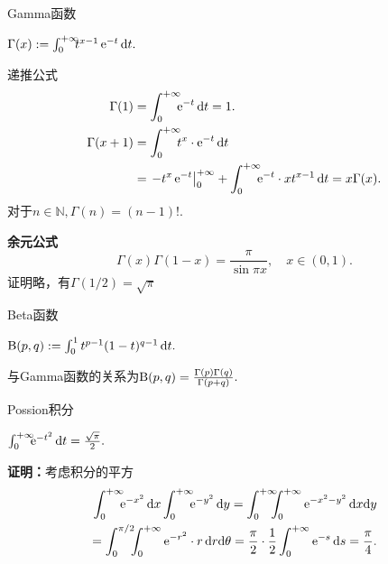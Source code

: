 \begin{example}{Gamma函数}{}
	\begin{center}
		$\Gamma(x):=\int\zti\bs5t^{x-1}\e{-t}\d t.$
	\end{center}
	递推公式
	\begin{align*}
		\Gamma(1)   & =\int\zti\bs5\e{-t}\d t=1.                                              \\
		\Gamma(x+1) & =\int\zti\bs5 t^x\cdot\e{-t}\d t                                        \\
					& =\edg{-t^x\e{-t}}\zti+\int\zti\bs5\e{-t}\cdot xt^{x-1}\d t=x\Gamma(x).
	\end{align*}
	对于$n\in\mathbb N,\Gamma(n)=(n-1)!.$

	\textbf{余元公式}
	\[
		\Gamma(x)\Gamma(1-x)=\frac{\pi}{\sin\pi x},\quad x\in(0,1).
	\]
	证明略，有$\Gamma(1/2)=\sqrt\pi$
\end{example}
\begin{example}{Beta函数}{}
	\begin{center}
		$\text B(p,q):=\int_0^1t^{p-1}(1-t)^{q-1}\d t.$ %
	\end{center}
	与Gamma函数的关系为$\text B(p,q)=\frac{\Gamma(p)\Gamma(q)}{\Gamma(p+q)}.$
\end{example}
\begin{example}{Possion积分}{}
	\begin{center}
		$\int\zti\bs5\e{-t^2}\d t=\frac{\sqrt\pi}2.$
	\end{center}
	\textbf{证明：}考虑积分的平方
	\begin{align*}
		\int\zti\bs5\e{-x^2}\d x\int\zti\bs5\e{-y^2}\d y=\int\zti\bs7\int\zti\e{-x^2-y^2}\d x\nd y \\
		=\int_0^{\pi/2}\bs5\int\zti\e{-r^2}\cdot r\d r\nd\theta=\frac\pi{2}\cdot\frac12\int\zti\e{-s}\d s=\frac\pi{4}.
	\end{align*}
	\iffalse
		由$\ex>0,\forall x\in\RR$
		\[
			\intt_A\e{-x^2-y^2}\d x\nd y\leqslant\intt_B\e{-x^2-y^2}\d x\nd y\leqslant\intt_C\e{-x^2-y^2}\d x\nd y
		\]
		其中
		\begin{align*}
			B & =\{(x,y)~|~0\leqslant x\leqslant R,0\leqslant y\leqslant R\}, \\
			A & =\{(x,y)~|~x^2+y^2\leqslant R^2,x\geqslant 0,y\geqslant 0\},  \\
			C & =\{(x,y)~|~x^2+y^2\leqslant 2R^2,x\geqslant 0,y\geqslant 0\}.
		\end{align*}
		又
		\begin{align*}
			\intt_A\e{-x^2-y^2}\d x\nd y & =\int_0^{\pi/2}\bs7\int_0^R\e{-\rho^2}\rho\d\rho\d\varphi=\frac{\pi}4\left(1-\e{-R^2}\right), \\
			\intt_B\e{-x^2-y^2}\d x\nd y & =\int_0^R\bs7\int_0^R\e{-x^2}\e{-y^2}\d x\nd y=\left(\int_0^R\e{-t^2}\d t\right)^2,          \\
			\intt_C\e{-x^2-y^2}\d x\nd y & =\frac{\pi}4\left(1-\e{-2R^2}\right).
		\end{align*}
		当$R\to+\infty$，即得$\int\zti\bs5\e{-t^2}\d t=\frac{\sqrt\pi}2$.
	\fi
\end{example}
